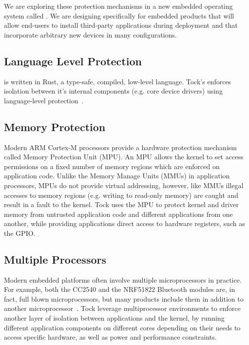 We are exploring these protection mechanisms in a new embedded operating system
called \name. We are designing \name specifically for embedded products that
will allow end-users to install third-party applications during deployment and
that incorporate arbitrary new devices in many configurations.

\subsection{Language Level Protection}

\name is written in Rust, a type-safe, compiled, low-level language. Tock's
enforces isolation between it's internal components (e.g. core device drivers)
using language-level protection~.

\subsection{Memory Protection}

Modern ARM Cortex-M processors provide a hardware protection mechanism called
Memory Protection Unit (MPU).  An MPU allows the kernel to set access
permissions on a fixed number of memory regions which are enforced on
application code. Unlike the Memory Manage Units (MMUs) in application
processors, MPUs do not provide virtual addressing, however, like MMUs illegal
accesses to memory regions (e.g. writing to read-only memory) are caught and
result in a fault to the kernel. Tock uses the MPU to protect kernel and driver
memory from untrusted application code and different applications from one
another, while providing applications direct access to hardware registers, such
as the GPIO.

\subsection{Multiple Processors}

Modern embedded platforms often involve multiple microprocessors in practice.
For example, both the CC2540 and the NRF51822 Bluetooth modules are, in fact,
full blown microprocessors, but many products include them in addition to
another microprocessor~. Tock leverage
multiprocessor environments to enforce another layer of isolation between
applications and the kernel, by running different application components on
different cores depending on their needs to access specific hardware, as well as
power and performance constraints.

